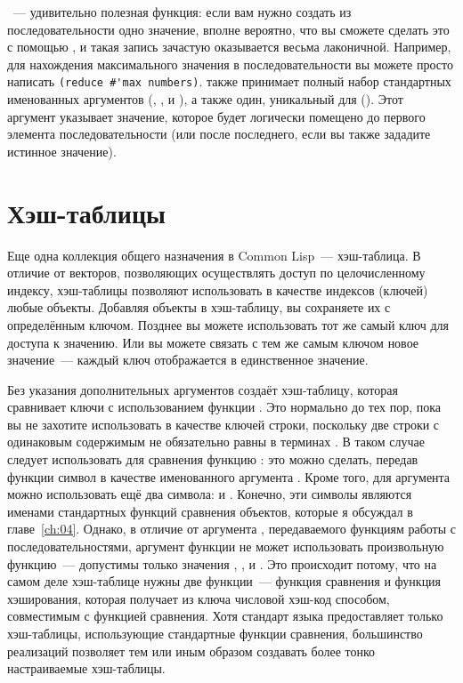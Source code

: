~--- удивительно полезная функция: если вам нужно создать из
последовательности одно значение, вполне вероятно, что вы сможете сделать это с помощью
, и такая запись зачастую оказывается весьма лаконичной.
Например, для нахождения максимального значения в последовательности вы можете просто
написать \lstinline!(reduce #'max numbers)!.  также принимает полный набор
стандартных именованных аргументов (, ,  и
), а также один, уникальный для  ().  Этот
аргумент указывает значение, которое будет логически помещено до первого элемента
последовательности (или после последнего, если вы также зададите  истинное
значение).

\section{Хэш-таблицы}

Еще одна коллекция общего назначения в Common Lisp~--- хэш-таблица.  В отличие от векторов,
позволяющих осуществлять доступ по целочисленному индексу,
хэш-таблицы позволяют использовать в качестве индексов (ключей) любые объекты.
Добавляя объекты в хэш-таблицу, вы сохраняете их с определённым ключом.  Позднее вы
можете использовать тот же самый ключ для доступа к значению.  Или вы можете связать
с тем же самым ключом новое значение~--- каждый ключ отображается в единственное значение.

Без указания дополнительных аргументов  создаёт хэш-таблицу, которая
сравнивает ключи с использованием функции .  Это нормально до тех пор, пока вы
не захотите использовать в качестве ключей строки, поскольку две строки с одинаковым
содержимым не обязательно равны в терминах .  В таком случае следует
использовать для сравнения функцию : это можно сделать, передав функции
 символ  в качестве именованного аргумента .
Кроме того, для аргумента  можно использовать ещё два символа:  и
.  Конечно, эти символы являются именами стандартных функций сравнения
объектов, которые я обсуждал в главе~\ref{ch:04}.  Однако, в отличие от аргумента ,
передаваемого функциям работы с последовательностями, аргумент  функции
 не может использовать произвольную функцию~--- допустимы только
значения , ,  и .  Это происходит потому, что
на самом деле хэш-таблице нужны две функции~--- функция сравнения и функция
хэширования, которая получает из ключа числовой хэш-код способом, совместимым с
функцией сравнения.  Хотя стандарт языка предоставляет
только хэш-таблицы, использующие стандартные функции сравнения, большинство
реализаций позволяет тем или иным образом создавать более тонко настраиваемые
хэш-таблицы.

